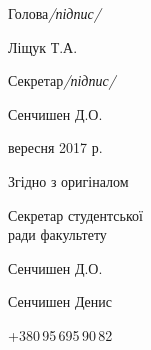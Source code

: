 \documentclass[
	a4paper,
	12pt,
	oneside,
	draft
]{extreport}
\newcommand{\sign}[2]{
	\bigskip\par\noindent
	\begin{minipage}[b]{70mm}#1\end{minipage}	\hfill
	\begin{minipage}[b]{50mm}#2\end{minipage}	\par	}
\newcommand{\signEqualProof}[3]{
	\bigskip\vfill
	\par\noindent #1
	\par\noindent Згідно з оригіналом
	\sign{#2}{#3}\vfill}
\newcommand{\writerTel}[2]{
	\vfill\scriptsize\parindent=-0.5mm
	\par\noindent #1
	\par\noindent #2}
\begin{document}
\bfseries 
\sign{Голова{\hfill\normalfont\small\itshape /підпис/}}{Ліщук Т.А.}
\sign{Секретар{\hfill\normalfont\small\itshape /підпис/}}{Сенчишен Д.О.}
\normalfont

\signEqualProof{21 вересня 2017 р.}{Секретар студентської\\ ради факультету}{Сенчишен Д.О.}

\writerTel{Сенчишен Денис}{+380\,95\,695\,90\,82}
%
%
%
%
%
%
%
%
%
%
%
%
%
%
%
\end{document}
